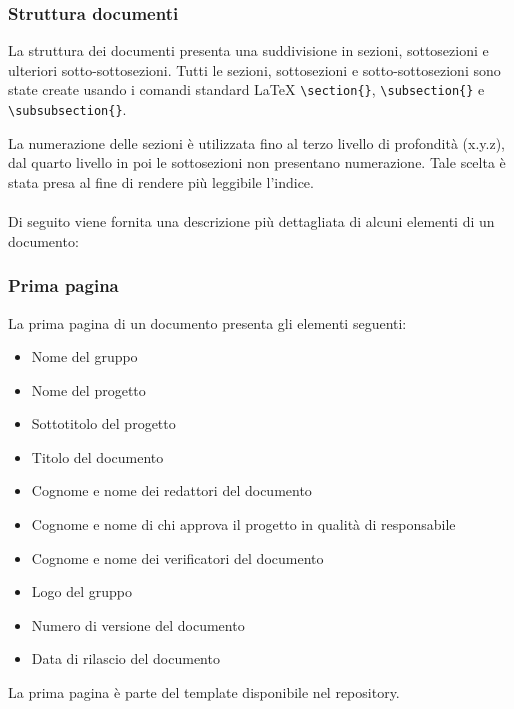 \documentclass[a4paper]{article}
\begin{document}
		\subsubsection{Struttura documenti}
		La struttura dei documenti presenta una suddivisione in sezioni, sottosezioni e ulteriori sotto-sottosezioni.
		Tutti le sezioni, sottosezioni e sotto-sottosezioni sono state create usando i comandi standard \LaTeX \space
		\verb|\section{}|, \verb|\subsection{}| e \verb|\subsubsection{}|.

		La numerazione delle sezioni è utilizzata fino al terzo livello di profondità (x.y.z), dal quarto livello in poi le sottosezioni
		 non presentano numerazione. Tale scelta è stata presa al fine di rendere più leggibile l'indice.
		\\ \\
		Di seguito viene fornita una descrizione più dettagliata di alcuni elementi di un documento:
		\subsubsection{Prima pagina}
		La prima pagina di un documento presenta gli elementi seguenti:
		\begin{itemize}
			\item Nome del gruppo
			\item Nome del progetto
			\item Sottotitolo del progetto
			\item Titolo del documento
			\item Cognome e nome dei redattori del documento
			\item Cognome e nome di chi approva il progetto in qualità di responsabile
			\item Cognome e nome dei verificatori del documento
			\item Logo del gruppo
			\item Numero di versione del documento
			\item Data di rilascio del documento
		\end{itemize}
		La prima pagina è parte del template disponibile nel repository.
		
\end{document}
